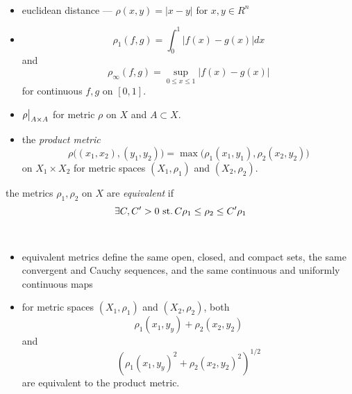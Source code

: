 \begin{exa}\
  \begin{itemize}
  \item euclidean distance ---
    ${\rho(x,y)=|x-y|}$ for ${x,y\in R^n}$
  \item
    \[ \rho_1(f,g)=\int_0^1|f(x)-g(x)|dx \]
    and
    \[ \rho_\infty(f,g)= \sup_{0\leq x\leq 1}|f(x)-g(x)| \]
    for continuous ${f, g}$ on ${[0, 1]}$.
  \item $\restr{\rho}{A\times A}$ for metric $\rho$ on $X$
    and ${A\subset X}$.
  \item the \emph{product metric}
    \[
    \rho\big((x_1, x_2), (y_1, y_2)\big)=
    \max\big(\rho_1(x_1,y_1),\rho_2(x_2, y_2)\big)
    \]
    on ${X_1\times X_2}$ for metric spaces
    ${(X_1,\rho_1)}$ and ${(X_2,\rho_2)}$.
  \end{itemize}
\end{exa}

\begin{defn}
  the metrics ${\rho_1, \rho_2}$ on $X$ are \emph{equivalent} if
  \[\exists C, C'>0\operatorname{\,st.} C\rho_1\leq\rho_2\leq C'\rho_1\]
\end{defn}


\begin{rem}{}\
  \begin{itemize}
  \item equivalent metrics define the same open, closed,
    and compact sets, the same convergent and Cauchy sequences,
    and the same continuous and uniformly continuous maps
  \item for metric spaces ${(X_1,\rho_1)}$ and ${(X_2,\rho_2)}$,
    both
    \[ \rho_1(x_1, y_y)+\rho_2(x_2,y_2) \]
    and
    \[ \left( {\rho_1(x_1, y_y)}^2+{\rho_2(x_2,y_2)}^2 \right)^{1/2} \]
    are equivalent to the product metric.
  \end{itemize}
\end{rem}


